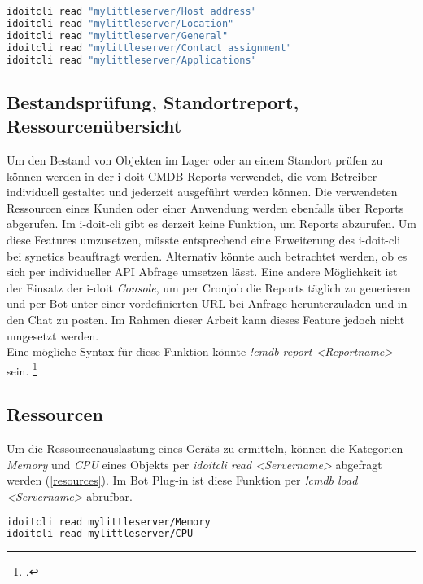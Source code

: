 \begin{lstlisting}[language=bash, label=show, caption=Detailansicht eines Objekts mit i-doit-cli]
idoitcli read "mylittleserver/Host address"
idoitcli read "mylittleserver/Location"
idoitcli read "mylittleserver/General"
idoitcli read "mylittleserver/Contact assignment"
idoitcli read "mylittleserver/Applications"
\end{lstlisting}

\subsection{Bestandsprüfung, Standortreport, Ressourcenübersicht}
Um den Bestand von Objekten im Lager oder an einem Standort prüfen zu können werden in der i-doit \acs{CMDB} Reports verwendet, die vom Betreiber individuell gestaltet und jederzeit ausgeführt werden können. Die verwendeten Ressourcen eines Kunden oder einer Anwendung werden ebenfalls über Reports abgerufen.  Im i-doit-cli gibt es derzeit keine Funktion, um Reports abzurufen. Um diese Features umzusetzen, müsste entsprechend eine Erweiterung des i-doit-cli bei synetics beauftragt werden. Alternativ könnte auch betrachtet werden, ob es sich per individueller API Abfrage umsetzen lässt. Eine andere Möglichkeit ist der Einsatz der i-doit \textit{Console}, um per Cronjob die Reports täglich zu generieren und per Bot unter einer vordefinierten URL bei Anfrage herunterzuladen und in den Chat zu posten. Im Rahmen dieser Arbeit kann dieses Feature jedoch nicht umgesetzt werden.\\
Eine mögliche Syntax für diese Funktion könnte \textit{!cmdb report <Reportname>} sein. 
\footcites[Vgl.][o. \pno]{idoit_2019_report}[Vgl.][o. \pno]{idoit_2019_console}

\subsection{Ressourcen}
Um die Ressourcenauslastung eines Geräts zu ermitteln, können die Kategorien \textit{Memory} und \textit{CPU} eines Objekts per \textit{idoitcli read <Servername>} abgefragt werden (\autoref{resources}). Im Bot Plug-in ist diese Funktion per \textit{!cmdb load <Servername>} abrufbar. 

\begin{lstlisting}[language=bash, label=resources, caption=Ressourcenauslastung eines Geräts]
idoitcli read mylittleserver/Memory
idoitcli read mylittleserver/CPU
\end{lstlisting}

